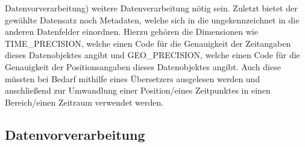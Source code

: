 \documentclass[usegeometry=true]{scrartcl}
\begin{document}
Datenvorverarbeitung) weitere Datenverarbeitung nötig sein. Zuletzt bietet der gewählte Datensatz noch Metadaten, welche sich in die ungekennzeichnet in die anderen Datenfelder einordnen. Hierzu gehören die Dimensionen wie TIME\_PRECISION, welche einen Code für die Genauigkeit der Zeitangaben dieses Datenobjektes angibt und GEO\_PRECISION, welche einen Code für die Genauigkeit der Positionsangaben dieses Datenobjektes angibt. Auch diese müssten bei Bedarf mithilfe eines Übersetzers ausgelesen werden und anschließend zur Umwandlung einer Position/eines Zeitpunktes in einen Bereich/einen Zeitraum verwendet werden.\\

\subsection{Datenvorverarbeitung} \label{sec:datenvorverarbeitung}
\end{document}
